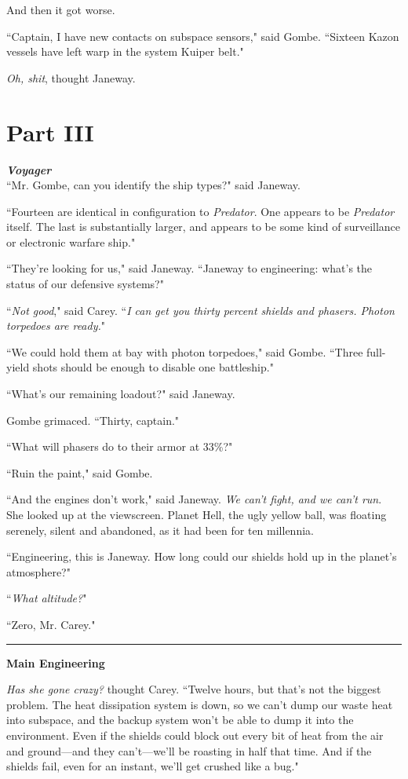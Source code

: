 \documentclass[twoside,letterpaper,12pt]{memoir}
\begin{document}
And then it got worse.

``Captain, I have new contacts on subspace sensors," said Gombe. ``Sixteen Kazon vessels have left warp in the system Kuiper belt."

\textit{Oh, shit}, thought Janeway.

\chapter*{Part III}

\textit{\textbf{Voyager}}\\

``Mr. Gombe, can you identify the ship types?" said Janeway.

``Fourteen are identical in configuration to \textit{Predator}. One appears to be \textit{Predator} itself. The last is substantially larger, and appears to be some kind of surveillance or electronic warfare ship."

``They're looking for us," said Janeway. ``Janeway to engineering: what's the status of our defensive systems?"

``\textit{Not good}," said Carey. ``\textit{I can get you thirty percent shields and phasers. Photon torpedoes are ready.}"

``We could hold them at bay with photon torpedoes," said Gombe. ``Three full-yield shots should be enough to disable one battleship."

``What's our remaining loadout?" said Janeway.

Gombe grimaced. ``Thirty, captain."

``What will phasers do to their armor at 33\%?"

``Ruin the paint," said Gombe.

``And the engines don't work," said Janeway. \textit{We can't fight, and we can't run}. She looked up at the viewscreen. Planet Hell, the ugly yellow ball, was floating serenely, silent and abandoned, as it had been for ten millennia.

``Engineering, this is Janeway. How long could our shields hold up in the planet's atmosphere?"

``\textit{What altitude?}"

``Zero, Mr. Carey."

\begin{center}\rule{3cm}{0.4 pt}\end{center}

\textbf{Main Engineering}

\textit{Has she gone crazy?} thought Carey. ``Twelve hours, but that's not the biggest problem. The heat dissipation system is down, so we can't dump our waste heat into subspace, and the backup system won't be able to dump it into the environment. Even if the shields could block out every bit of heat from the air and ground---and they can't---we'll be roasting in half that time. And if the shields fail, even for an instant, we'll get crushed like a bug."
\end{document}

